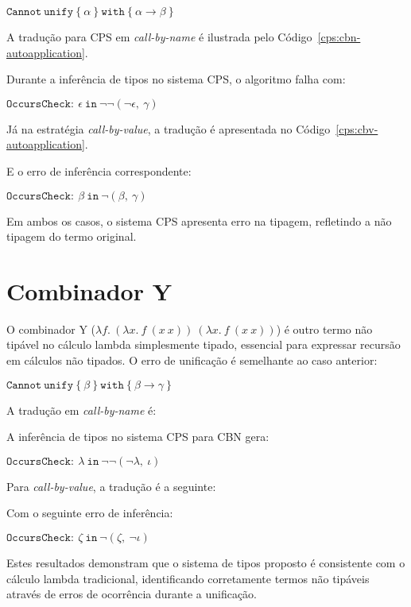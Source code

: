 \begin{center}
  $\mathtt{Cannot\ unify}\ \{\ \alpha\ \}\ \mathtt{with}\ \{\ \alpha \to \beta\ \}$
\end{center}
A tradução para CPS em \textit{call-by-name} é ilustrada pelo Código~\ref{cps:cbn-autoapplication}.

Durante a inferência de tipos no sistema CPS, o algoritmo falha com:
\begin{center}
  $\mathtt{OccursCheck}:\ \epsilon\ \mathtt{in}\ \neg\neg(\neg\epsilon,\ \gamma)$
\end{center}
Já na estratégia \textit{call-by-value}, a tradução é apresentada no Código~\ref{cps:cbv-autoapplication}.

E o erro de inferência correspondente:
\begin{center}
  $\mathtt{OccursCheck}:\ \beta\ \mathtt{in}\ \neg(\beta,\ \gamma)$
\end{center}
Em ambos os casos, o sistema CPS apresenta erro na tipagem, refletindo a não tipagem do termo original.

\section{Combinador Y}\label{sec:y-combinator}
O combinador Y ($\lambda f.\ (\lambda x.\ f\ (x\ x))\ (\lambda x.\ f\ (x\ x))$) é outro termo não tipável no cálculo lambda simplesmente tipado, essencial para expressar recursão em cálculos não tipados.
O erro de unificação é semelhante ao caso anterior:

\begin{center}
  $\mathtt{Cannot\ unify}\ \{\ \beta\ \}\ \mathtt{with}\ \{\ \beta \to \gamma\ \}$
\end{center}
A tradução em \textit{call-by-name} é:

A inferência de tipos no sistema CPS para CBN gera:
\begin{center}
  $\mathtt{OccursCheck}:\ \lambda\ \mathtt{in}\ \neg\neg(\neg\lambda,\ \iota)$
\end{center}
Para \textit{call-by-value}, a tradução é a seguinte:

Com o seguinte erro de inferência:
\begin{center}
  $\mathtt{OccursCheck}:\ \zeta\ \mathtt{in}\ \neg(\zeta,\ \neg\iota)$
\end{center}
Estes resultados demonstram que o sistema de tipos proposto é consistente com o cálculo lambda tradicional, identificando corretamente termos não tipáveis através de erros de ocorrência durante a unificação.
